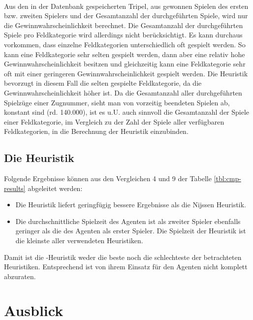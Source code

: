\vspace{0.5cm}
\\Aus den in der Datenbank gespeicherten Tripel, aus gewonnen Spielen des ersten bzw. zweiten Spielers und der Gesamtanzahl der durchgeführten Spiele, wird nur die Gewinnwahrscheinlichkeit berechnet. Die Gesamtanzahl der durchgeführten Spiele pro Feldkategorie wird allerdings nicht berücksichtigt. Es kann durchaus vorkommen, dass einzelne Feldkategorien unterschiedlich oft gespielt werden. So kann eine Feldkategorie sehr selten gespielt werden, dann aber eine relativ hohe Gewinnwahrscheinlichkeit besitzen und gleichzeitig kann eine Feldkategorie sehr oft mit einer geringeren Gewinnwahrscheinlichkeit gespielt werden. Die Heuristik bevorzugt in diesem Fall die selten gespielte Feldkategorie, da die Gewinnwahrscheinlichkeit höher ist. Da die Gesamtanzahl aller durchgeführten Spielzüge einer Zugnummer, sieht man von vorzeitig beendeten Spielen ab, konstant sind (rd. 140.000), ist es u.U. auch sinnvoll die Gesamtanzahl der Spiele einer Feldkategorie, im Vergleich zu der Zahl der Spiele aller verfügbaren Feldkategorien, in die Berechnung der Heuristik einzubinden.

\subsection{Die Heuristik }
Folgende Ergebnisse können aus den Vergleichen 4 und 9 der Tabelle \ref{tbl:cmp-results} abgeleitet werden:
\begin{itemize}
\item Die Heuristik liefert geringfügig bessere Ergebnisse als die Nijssen Heuristik.
\item Die durchschnittliche Spielzeit des Agenten ist als zweiter Spieler ebenfalls geringer als die des Agenten als erster Spieler. Die Spielzeit der  Heuristik ist die kleinste aller verwendeten Heuristiken.
\end{itemize}
Damit ist die -Heuristik weder die beste noch die schlechteste der betrachteten Heuristiken. Entsprechend ist von ihrem Einsatz für den Agenten \mxZitat{\abp} nicht komplett abzuraten.
\newpage
\section{Ausblick}
